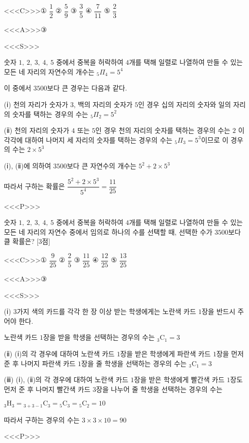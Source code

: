 \documentclass{oblivoir}
\begin{document}
<<<C>>>① $\dfrac{1}{2}$ ② $\dfrac{5}{9}$ ③ $\dfrac{3}{5}$ ④ $\dfrac{7}{11}$ ⑤ $\dfrac{2}{3}$

<<<A>>>③

<<<S>>>

숫자 $1,\:2,\:3,\:4,\:5$ 중에서 중복을 허락하여 $4$개를 택해 일렬로 나열하여 만들 수 있는 모든 네 자리의 자연수의 개수는 ${}_{5}\Pi_{4}= 5^{4}$

이 중에서 $3500$보다 큰 경우는 다음과 같다.

(ⅰ) 천의 자리가 숫자가 $3$, 백의 자리의 숫자가 $5$인 경우
십의 자리의 숫자와 일의 자리의 숫자를 택하는 경우의 수는 ${}_{5}\Pi_{2}= 5^{2}$

(ⅱ) 천의 자리의 숫자가 $4$ 또는 $5$인 경우
천의 자리의 숫자를 택하는 경우의 수는 $2$
이 각각에 대하여 나머지 세 자리의 숫자를 택하는 경우의 수는 ${}_{5}\Pi_{3}= 5^{3}$이므로 이 경우의 수는 $2\times 5^{3}$

(ⅰ), (ⅱ)에 의하여 $3500$보다 큰 자연수의 개수는 $5^{2}+ 2\times 5^{3}$

따라서 구하는 확률은 $\dfrac{5^{2}+2\times 5^{3}}{5^{4}}=\dfrac{11}{25}$

<<<P>>>

숫자 $1,\:2,\:3,\:4,\:5$ 중에서 중복을 허락하여 $4$개를 택해 일렬로 나열하여 만들 수 있는 모든 네 자리의 자연수 중에서 임의로 하나의 수를 선택할 때, 선택한 수가 $3500$보다 클 확률은? [3점]

<<<C>>>① $\dfrac{9}{25}$ ② $\dfrac{2}{5}$ ③ $\dfrac{11}{25}$ ④ $\dfrac{12}{25}$ ⑤ $\dfrac{13}{25}$

<<<A>>>③

<<<S>>>

(ⅰ) $3$가지 색의 카드를 각각 한 장 이상 받는 학생에게는 노란색 카드 $1$장을 반드시 주어야 한다.

노란색 카드 $1$장을 받을 학생을 선택하는 경우의 수는 ${}_{3}\mathrm{C}_{1}= 3$

(ⅱ) (ⅰ)의 각 경우에 대하여 노란색 카드 $1$장을 받은 학생에게 파란색 카드 $1$장을 먼저 준 후 나머지 파란색 카드 $1$장을 줄 학생을 선택하는 경우의 수는 ${}_{3}\mathrm{C}_{1}=3$

(ⅲ) (ⅰ), (ⅱ)의 각 경우에 대하여 노란색 카드 $1$장을 받은 학생에게 빨간색 카드 $1$장도 먼저 준 후 나머지 빨간색 카드 $3$장을 나누어 줄 학생을 선택하는 경우의 수는 

${}_{3}\mathrm{H}_{3}={}_{3+3-1}\mathrm{C}_{3}={}_{5}\mathrm{C}_{3}={}_{5}\mathrm{C}_{2}=10$

따라서 구하는 경우의 수는 $3\times 3\times 10 =90$

<<<P>>>
\end{document}
